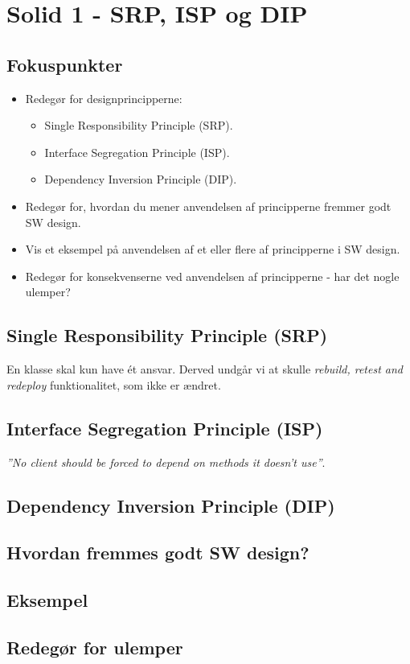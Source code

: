 \section{Solid 1 - SRP, ISP og DIP}

\subsection{Fokuspunkter}

\begin{itemize}
	\item Redegør for designprincipperne:
	\begin{itemize}
		\item Single Responsibility Principle (SRP).
		\item Interface Segregation Principle (ISP).
		\item Dependency Inversion Principle (DIP).
	\end{itemize}
	\item Redegør for, hvordan du mener anvendelsen af principperne fremmer godt SW design.
	\item Vis et eksempel på anvendelsen af et eller flere af principperne i SW design.
	\item Redegør for konsekvenserne ved anvendelsen af principperne - har det nogle ulemper?
\end{itemize}


\subsection{Single Responsibility Principle (SRP)}
En klasse skal kun have ét ansvar. Derved undgår vi at skulle \textit{rebuild, retest and redeploy} funktionalitet, som ikke er ændret.

\subsection{Interface Segregation Principle (ISP)}
\textit{''No client should be forced to depend on methods it doesn't use''}.

\subsection{Dependency Inversion Principle (DIP)}

\subsection{Hvordan fremmes godt SW design?}

\subsection{Eksempel}

\subsection{Redegør for ulemper}